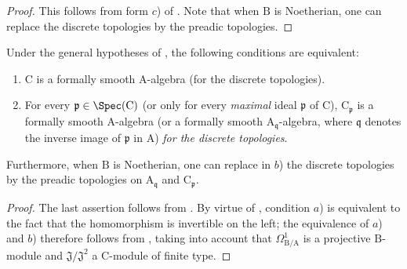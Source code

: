 \begin{proof}
This follows from form $c$) of .
Note that when $\mathrm{B}$ is Noetherian, one can replace the discrete topologies by the preadic topologies.
\end{proof}

\begin{corollary}[22.6.6]
\label{0.22.6.6}
Under the general hypotheses of , the following conditions are equivalent:
\begin{enumerate}
  \item[a)] $\mathrm{C}$ is a formally smooth $\mathrm{A}$-algebra (for the discrete topologies).
  \item[b)] For every $\mathfrak{p}\in\Spec(\mathrm{C})$ (or only for every \emph{maximal} ideal $\mathfrak{p}$ of $\mathrm{C}$), $\mathrm{C}_\mathfrak{p}$ is a formally smooth $\mathrm{A}$-algebra (or a formally smooth $\mathrm{A}_{\mathfrak{q}}$-algebra, where $\mathfrak{q}$ denotes the inverse image of $\mathfrak{p}$ in $\mathrm{A}$) \emph{for the discrete topologies}.
\end{enumerate}
Furthermore, when $\mathrm{B}$ is Noetherian, one can replace in $b$) the discrete topologies by the preadic topologies on $\mathrm{A}_{\mathfrak{q}}$ and $\mathrm{C}_\mathfrak{p}$.
\end{corollary}

\begin{proof}
The last assertion follows from .
By virtue of , condition $a$) is equivalent to the fact that
the homomorphism  is invertible on the left; the equivalence
of $a$) and $b$) therefore follows from , taking into account
that $\Omega^1_{\mathrm{B}/\mathrm{A}}$ is a projective $\mathrm{B}$-module
and $\mathfrak{J}/\mathfrak{J}^2$ a $\mathrm{C}$-module of finite type.
\end{proof}

